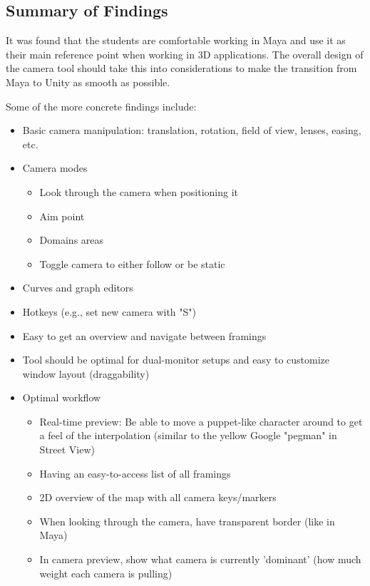 

\subsection{Summary of Findings}
It was found that the students are comfortable working in Maya and use it as their main reference point when working in 3D applications. The overall design of the camera tool should take this into considerations to make the transition from Maya to Unity as smooth as possible.

Some of the more concrete findings include:
\begin{itemize}
\item Basic camera manipulation: translation, rotation, field of view, lenses, easing, etc.
\item Camera modes
\begin{itemize}
\item Look through the camera when positioning it
\item Aim point
\item Domains areas
\item Toggle camera to either follow or be static
\end{itemize}
\item Curves and graph editors
\item Hotkeys (e.g., set new camera with "S")
\item Easy to get an overview and navigate between framings
\item Tool should be optimal for dual-monitor setups and easy to customize window layout (draggability)
\item Optimal workflow
\begin{itemize}
\item Real-time preview: Be able to move a puppet-like character around to get a feel of the interpolation (similar to the yellow Google "pegman" in Street View)
\item Having an easy-to-access list of all framings
\item 2D overview of the map with all camera keys/markers
\item When looking through the camera, have transparent border (like in Maya)
\item In camera preview, show what camera is currently 'dominant' (how much weight each camera is pulling)
\end{itemize}
\end{itemize}

